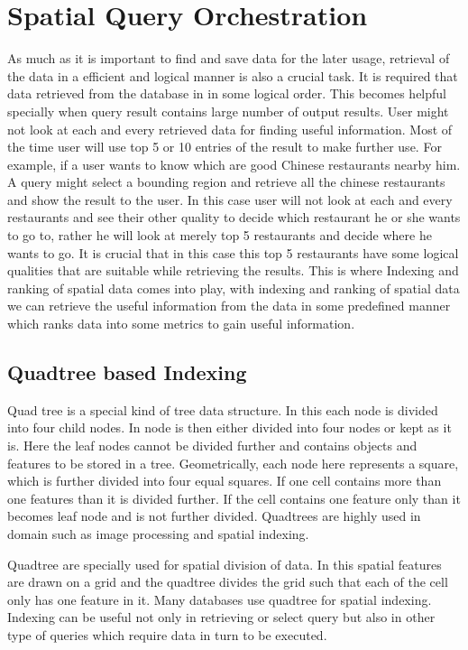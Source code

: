 \chapter{Spatial Query Orchestration}
As much as it is important to find and save data for the later usage, retrieval of the data in a efficient and logical manner is also a crucial task. It is required that data retrieved from the database in in some logical order. This becomes helpful specially when query result contains large number of output results. User might not look at each and every retrieved data for finding useful information. Most of the time user will use top 5 or 10 entries of the result to make further use. For example, if a user wants to know which are good Chinese restaurants nearby him. A query might select a bounding region and retrieve all the chinese restaurants and show the result to the user. In this case user will not look at each and every restaurants and see their other quality to decide which restaurant he or she wants to go to, rather he will look at merely top 5 restaurants and decide where he wants to go. It is crucial that in this case this top 5 restaurants have some logical qualities that are suitable while retrieving the results. This is where Indexing and ranking of spatial data comes into play, with indexing and ranking of spatial data we can retrieve the useful information from the data in some predefined manner which ranks data into some metrics to gain useful information.

\section{Quadtree based Indexing}
Quad tree is a special kind of tree data structure. In this each node is divided into four child nodes. In node is then either divided into four nodes or kept as it is. Here the leaf nodes cannot be divided further and contains objects and features to be stored in a tree. Geometrically, each node here represents a square, which is further divided into four equal squares. If one cell contains more than one features than it is divided further. If the cell contains one feature only than it becomes leaf node and is not further divided. Quadtrees are highly used in domain such as image processing and spatial indexing. 
\newline
\par Quadtree are specially used for spatial division of data. In this spatial features are drawn on a grid and the quadtree divides the grid such that each of the cell only has one feature in it. Many databases use quadtree for spatial indexing. Indexing can be useful not only in retrieving or select query but also in other type of queries which require data in turn to be executed. 

